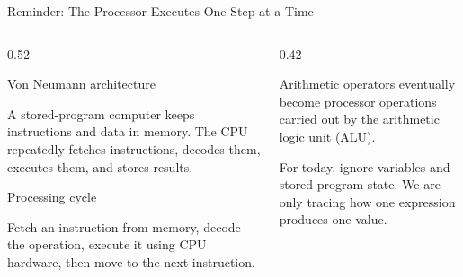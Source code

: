 \documentclass[aspectratio=169,10pt]{beamer}
\begin{document}
\begin{frame}[shrink=10]{Reminder: The Processor Executes One Step at a Time}

  \begin{columns}[T,onlytextwidth]

    \begin{column}{0.52\textwidth}

      \begin{block}{Von Neumann architecture}

        A stored-program computer keeps instructions and data in memory. The CPU repeatedly fetches instructions, decodes them, executes them, and stores results.

      \end{block}

      \begin{block}{Processing cycle}

        Fetch an instruction from memory, decode the operation, execute it using CPU hardware, then move to the next instruction.

      \end{block}

    \end{column}

    \begin{column}{0.42\textwidth}

      \begin{keyidea}

        Arithmetic operators eventually become processor operations carried out by the arithmetic logic unit (ALU).

      \end{keyidea}

      \begin{exampleblockcp}

        For today, ignore variables and stored program state. We are only tracing how one expression produces one value.

      \end{exampleblockcp}
    \end{column}

  \end{columns}

\end{frame}

\end{document}
